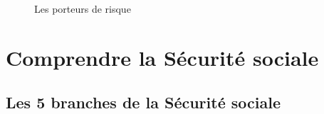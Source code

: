           \begin{figure}[H]
\centering
{}
\caption{Les porteurs de risque}
\label{fig:Mod-Enseig}
\end{figure}
        

\newpage
    \section{Comprendre la Sécurité sociale}
    \subsection{Les 5 branches de la Sécurité sociale}
              \begin{figure}[H]
\centering
{}
\end{figure}
    
        
        
